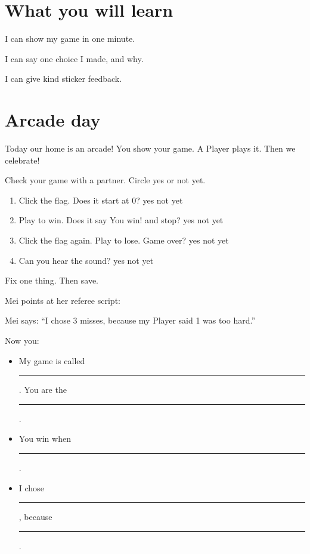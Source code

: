 
\section{What you will learn}
\begin{ican}
  \item I can show my game in one minute.
  \item I can say one choice I made, and why.
  \item I can give kind sticker feedback.
\end{ican}

\section{Arcade day}
Today our home is an arcade! You show your game. A Player plays it. Then we celebrate!

\begin{exercise}
Check your game with a partner. Circle yes or not yet.
\begin{enumerate}[leftmargin=1.4em,itemsep=2pt]
  \item Click the flag. Does it start at 0? \hfill yes \quad not yet
  \item Play to win. Does it say You win! and stop? \hfill yes \quad not yet
  \item Click the flag again. Play to lose. Game over? \hfill yes \quad not yet
  \item Can you hear the sound? \hfill yes \quad not yet
\end{enumerate}
Fix one thing. Then save.
\end{exercise}

\begin{exercise}
Mei points at her referee script:
\begin{center}
\begin{scratch}[scale=0.8]
\end{scratch}
\end{center}
Mei says: \enquote{I chose 3 misses, because my Player said 1 was too hard.}

Now you:
\begin{itemize}[leftmargin=1.4em,itemsep=6pt]
  \item My game is called \rule{5cm}{0.4pt}. You are the \rule{3cm}{0.4pt}.
  \item You win when \rule{6.5cm}{0.4pt}.
  \item I chose \rule{4cm}{0.4pt}, because \rule{4cm}{0.4pt}.
\end{itemize}
\end{exercise}

